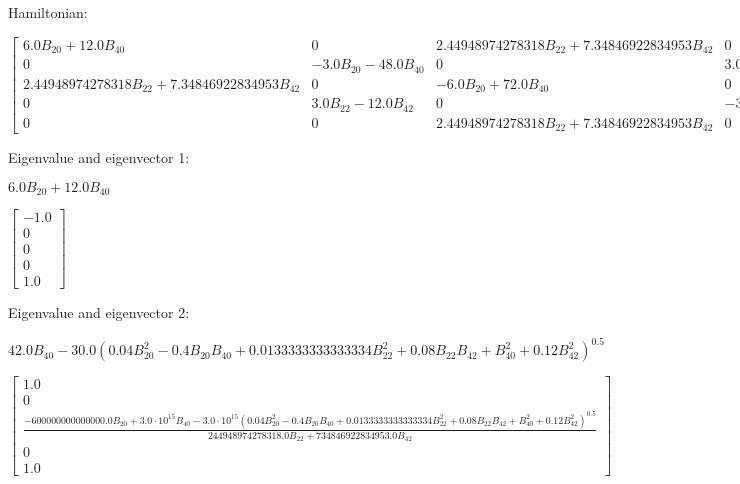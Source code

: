 \documentclass[8pt]{report}
\begin{document}
Hamiltonian:

\begin{math}
\left[\begin{matrix}6.0 B_{20} + 12.0 B_{40} & 0 & 2.44948974278318 B_{22} + 7.34846922834953 B_{42} & 0 & 0\\0 & - 3.0 B_{20} - 48.0 B_{40} & 0 & 3.0 B_{22} - 12.0 B_{42} & 0\\2.44948974278318 B_{22} + 7.34846922834953 B_{42} & 0 & - 6.0 B_{20} + 72.0 B_{40} & 0 & 2.44948974278318 B_{22} + 7.34846922834953 B_{42}\\0 & 3.0 B_{22} - 12.0 B_{42} & 0 & - 3.0 B_{20} - 48.0 B_{40} & 0\\0 & 0 & 2.44948974278318 B_{22} + 7.34846922834953 B_{42} & 0 & 6.0 B_{20} + 12.0 B_{40}\end{matrix}\right]
\end{math}

Eigenvalue and eigenvector 1:

\begin{math}
6.0 B_{20} + 12.0 B_{40}
\end{math}

\begin{math}
\left[\begin{matrix}-1.0\\0\\0\\0\\1.0\end{matrix}\right]
\end{math}

Eigenvalue and eigenvector 2:

\begin{math}
42.0 B_{40} - 30.0 \left(0.04 B_{20}^{2} - 0.4 B_{20} B_{40} + 0.0133333333333334 B_{22}^{2} + 0.08 B_{22} B_{42} + B_{40}^{2} + 0.12 B_{42}^{2}\right)^{0.5}
\end{math}

\begin{math}
\left[\begin{matrix}1.0\\0\\\frac{- 600000000000000.0 B_{20} + 3.0 \cdot 10^{15} B_{40} - 3.0 \cdot 10^{15} \left(0.04 B_{20}^{2} - 0.4 B_{20} B_{40} + 0.0133333333333334 B_{22}^{2} + 0.08 B_{22} B_{42} + B_{40}^{2} + 0.12 B_{42}^{2}\right)^{0.5}}{244948974278318.0 B_{22} + 734846922834953.0 B_{42}}\\0\\1.0\end{matrix}\right]
\end{math}
\end{document}
